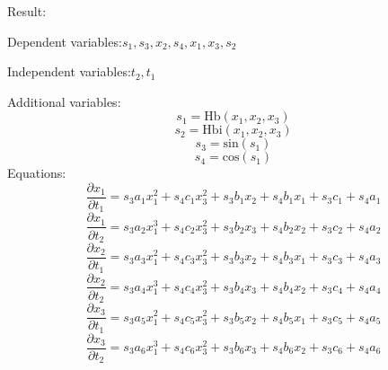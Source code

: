 \documentclass[10pt,a4paper]{article}
\begin{document}
Result:

Dependent variables:$s_{1}, s_{3}, x_{2}, s_{4}, x_{1}, x_{3}, s_{2}$

Independent variables:$t_{2}, t_{1}$

Additional variables:
\begin{dmath*}s_{1} = \text{Hb}\left(x_{1}, x_{2}, x_{3}\right)\end{dmath*}
\begin{dmath*}s_{2} = \text{Hbi}\left(x_{1}, x_{2}, x_{3}\right)\end{dmath*}
\begin{dmath*}s_{3} = \text{sin}\left(s_{1}\right)\end{dmath*}
\begin{dmath*}s_{4} = \text{cos}\left(s_{1}\right)\end{dmath*}
Equations:
\begin{dmath*}\frac{\partial x_{1}}{\partial t_{1}} = s_{3}  a_{1}  x_{1} ^ {2} + s_{4}  c_{1}  x_{3} ^ {2} + s_{3}  b_{1}  x_{2} + s_{4}  b_{1}  x_{1} + s_{3}  c_{1} + s_{4}  a_{1}\end{dmath*}
\begin{dmath*}\frac{\partial x_{1}}{\partial t_{2}} = s_{3}  a_{2}  x_{1} ^ {3} + s_{4}  c_{2}  x_{3} ^ {2} + s_{3}  b_{2}  x_{3} + s_{4}  b_{2}  x_{2} + s_{3}  c_{2} + s_{4}  a_{2}\end{dmath*}
\begin{dmath*}\frac{\partial x_{2}}{\partial t_{1}} = s_{3}  a_{3}  x_{1} ^ {2} + s_{4}  c_{3}  x_{3} ^ {2} + s_{3}  b_{3}  x_{2} + s_{4}  b_{3}  x_{1} + s_{3}  c_{3} + s_{4}  a_{3}\end{dmath*}
\begin{dmath*}\frac{\partial x_{2}}{\partial t_{2}} = s_{3}  a_{4}  x_{1} ^ {3} + s_{4}  c_{4}  x_{3} ^ {2} + s_{3}  b_{4}  x_{3} + s_{4}  b_{4}  x_{2} + s_{3}  c_{4} + s_{4}  a_{4}\end{dmath*}
\begin{dmath*}\frac{\partial x_{3}}{\partial t_{1}} = s_{3}  a_{5}  x_{1} ^ {2} + s_{4}  c_{5}  x_{3} ^ {2} + s_{3}  b_{5}  x_{2} + s_{4}  b_{5}  x_{1} + s_{3}  c_{5} + s_{4}  a_{5}\end{dmath*}
\begin{dmath*}\frac{\partial x_{3}}{\partial t_{2}} = s_{3}  a_{6}  x_{1} ^ {3} + s_{4}  c_{6}  x_{3} ^ {2} + s_{3}  b_{6}  x_{3} + s_{4}  b_{6}  x_{2} + s_{3}  c_{6} + s_{4}  a_{6}\end{dmath*}
\end{document}
